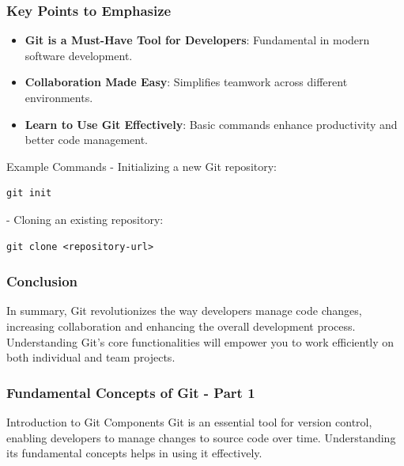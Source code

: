 \documentclass{beamer}
\begin{document}
\begin{frame}[fragile]
    \frametitle{Key Points to Emphasize}
    \begin{itemize}
        \item \textbf{Git is a Must-Have Tool for Developers}: Fundamental in modern software development.
        \item \textbf{Collaboration Made Easy}: Simplifies teamwork across different environments.
        \item \textbf{Learn to Use Git Effectively}: Basic commands enhance productivity and better code management.
    \end{itemize}

    \begin{block}{Example Commands}
        - Initializing a new Git repository:
        \begin{lstlisting}
git init
        \end{lstlisting}
        
        - Cloning an existing repository:
        \begin{lstlisting}
git clone <repository-url>
        \end{lstlisting}
    \end{block}
\end{frame}

\begin{frame}[fragile]
    \frametitle{Conclusion}
    In summary, Git revolutionizes the way developers manage code changes, increasing collaboration and enhancing the overall development process. Understanding Git's core functionalities will empower you to work efficiently on both individual and team projects.
\end{frame}

\begin{frame}[fragile]
    \frametitle{Fundamental Concepts of Git - Part 1}
    \begin{block}{Introduction to Git Components}
        Git is an essential tool for version control, enabling developers to manage changes to source code over time. 
        Understanding its fundamental concepts helps in using it effectively.
    \end{block}
\end{frame}
\end{document}
